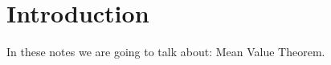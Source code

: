 \documentclass{amsart}
\begin{document}
\section{Introduction}
In these notes we are going to talk about: Mean Value Theorem. 
\end{document}

